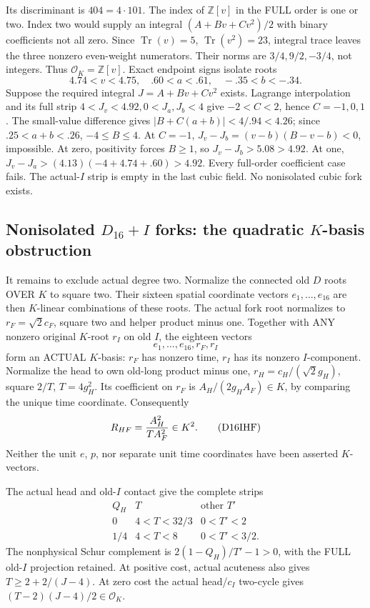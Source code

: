 \documentclass[11pt]{article}
\begin{document}
Its discriminant is \(404=4\cdot101\).
The index of \(\mathbb Z[v]\) in
the FULL order is one or two.
Index two would supply an integral
\((A+Bv+Cv^2)/2\) with binary
coefficients not all zero.
Since \(\operatorname{Tr}(v)=5\),
\(\operatorname{Tr}(v^2)=23\),
integral trace leaves the three nonzero
even-weight numerators.
Their norms are \(3/4,9/2,-3/4\),
not integers.
Thus \(\mathcal O_K=\mathbb Z[v]\).
Exact endpoint signs isolate roots
\[
                        4.74<v<4.75,\quad .60<a<.61,\quad-.35<b<-.34 .
\]
Suppose the required integral
\(J=A+Bv+Cv^2\) exists.
Lagrange interpolation and its full
strip \(4<J_v<4.92,0<J_a,J_b<4\)
give \(-2<C<2\), hence \(C=-1,0,1\).
The small-value difference gives
\(|B+C(a+b)|<4/.94<4.26\);
since \(.25<a+b<.26\), \(-4\le B\le4\).
At \(C=-1\),
\(J_v-J_b=(v-b)(B-v-b)<0\), impossible.
At zero, positivity forces \(B\ge1\),
so \(J_v-J_b>5.08>4.92\).
At one,
\(J_v-J_a>(4.13)(-4+4.74+.60)>4.92\).
Every full-order coefficient case fails.
The actual-\(I\) strip is empty in the
last cubic field.
No nonisolated cubic fork exists.

\subsection{Nonisolated \(D_{16}+I\) forks: the quadratic \(K\)-basis obstruction}
\label{app:arithD16Inonisolatedquadratic}

It remains to exclude actual degree two.
Normalize the connected old \(D\) roots
OVER \(K\) to square two.
Their sixteen spatial coordinate vectors
\(e_1,\ldots,e_{16}\) are then
\(K\)-linear combinations of these roots.
The actual fork root normalizes to
\(r_F=\sqrt2c_F\), square two and
helper product minus one.
Together with ANY nonzero original
\(K\)-root \(r_I\) on old \(I\), the
eighteen vectors
\[
                          e_1,\ldots,e_{16},r_F,r_I
\]
form an ACTUAL \(K\)-basis:
\(r_F\) has nonzero time, \(r_I\)
has its nonzero \(I\)-component.
Normalize the head to own old-long
product minus one,
\(r_H=c_H/(\sqrt2g_H)\), square \(2/T\),
\(T=4g_H^2\).
Its coefficient on \(r_F\) is
\(A_H/(2g_HA_F)\in K\), by comparing
the unique time coordinate.
Consequently
\[
                         R_{HF}={A_H^2\over T A_F^2}\in K^2 .
\tag{D16IHF}\label{eq:arithD16Iheadforksquare}
\]
Neither the unit \(e\), \(p\), nor
separate unit time coordinates have
been asserted \(K\)-vectors.

The actual head and old-\(I\) contact
give the complete strips
\[
\begin{array}{c|c|c}
 Q_H&T&\text{other }T'\\ \hline
0&4<T<32/3&0<T'<2\\
1/4&4<T<8&0<T'<3/2 .
\end{array}
\]
The nonphysical Schur complement is
\(2(1-Q_H)/T'-1>0\), with the FULL
old-\(I\) projection retained.
At positive cost, actual acuteness
also gives \(T\ge2+2/(J-4)\).
At zero cost the actual head/\(c_I\)
two-cycle gives
\((T-2)(J-4)/2\in\mathcal O_K\).
\end{document}
